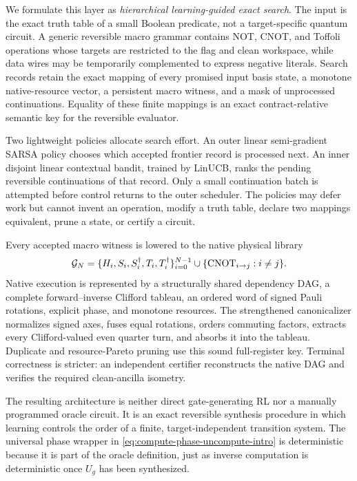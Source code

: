 We formulate this layer as \emph{hierarchical learning-guided exact search}.  The input is the exact truth table of a small Boolean predicate, not a target-specific quantum circuit.  A generic reversible macro grammar contains NOT, CNOT, and Toffoli operations whose targets are restricted to the flag and clean workspace, while data wires may be temporarily complemented to express negative literals.  Search records retain the exact mapping of every promised input basis state, a monotone native-resource vector, a persistent macro witness, and a mask of unprocessed continuations.  Equality of these finite mappings is an exact contract-relative semantic key for the reversible evaluator.

Two lightweight policies allocate search effort.  An outer linear semi-gradient SARSA policy chooses which accepted frontier record is processed next.  An inner disjoint linear contextual bandit, trained by LinUCB, ranks the pending reversible continuations of that record.  Only a small continuation batch is attempted before control returns to the outer scheduler.  The policies may defer work but cannot invent an operation, modify a truth table, declare two mappings equivalent, prune a state, or certify a circuit.

Every accepted macro witness is lowered to the native physical library
\begin{equation}
\mathcal{G}_N=
\{H_i,S_i,S_i^\dagger,T_i,T_i^\dagger\}_{i=0}^{N-1}
\cup
\{\operatorname{CNOT}_{i\rightarrow j}:i\neq j\}.
\label{eq:gate-library}
\end{equation}
Native execution is represented by a structurally shared dependency DAG, a complete forward--inverse Clifford tableau, an ordered word of signed Pauli rotations, explicit phase, and monotone resources.  The strengthened canonicalizer normalizes signed axes, fuses equal rotations, orders commuting factors, extracts every Clifford-valued even quarter turn, and absorbs it into the tableau.  Duplicate and resource-Pareto pruning use this sound full-register key.  Terminal correctness is stricter: an independent certifier reconstructs the native DAG and verifies the required clean-ancilla isometry.

The resulting architecture is neither direct gate-generating RL nor a manually programmed oracle circuit.  It is an exact reversible synthesis procedure in which learning controls the order of a finite, target-independent transition system.  The universal phase wrapper in \eqref{eq:compute-phase-uncompute-intro} is deterministic because it is part of the oracle definition, just as inverse computation is deterministic once $U_g$ has been synthesized.

